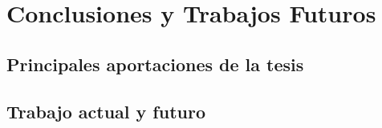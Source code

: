  
\chapter{Conclusiones y Trabajos Futuros}
		
	\section{Principales aportaciones de la tesis} 
		

	\section{Trabajo actual y futuro} 